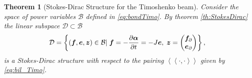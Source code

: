 \documentclass[11pt]{article}
\newtheorem{theorem}{Theorem}
\begin{document}
{\begin{theorem}[Stokes-Dirac Structure for the Timoshenko beam]
			Consider the space of power variables $\mathcal{B}$ defined in \eqref{eq:bondTimo}. By theorem \ref{th:StokesDirac} the linear subspace $\mathcal{D} \subset \mathcal{B}$
			\begin{equation}
			\mathcal{D} =  \left\{(\bm{f}, \bm{e},\bm{z}) \in \mathcal{B} | \; \bm{f} = - \diffp{\bm{\alpha}}{t} = -J\bm{e}, \; \bm{z} = \begin{pmatrix} \bm{f}_{\partial} \\ \bm{e}_{\partial} \end{pmatrix} 
			\right\},
			\end{equation}
			is a Stokes-Dirac structure with respect to the pairing $\left\langle \left\langle \cdot, \cdot \right\rangle \right\rangle$ given by \eqref{eq:bil_Timo}.
		\end{theorem}
	}
	
\end{document}
